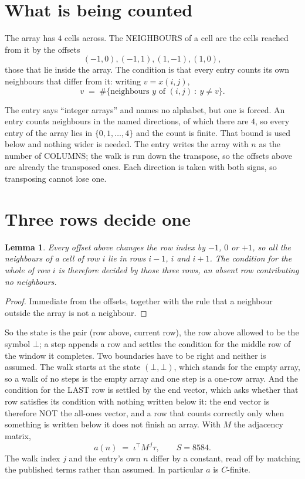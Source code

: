 \documentclass[11pt,a4paper]{article}
\theoremstyle{plain}
\newtheorem{lemma}[theorem]{Lemma}
\theoremstyle{definition}
\begin{document}
\section{What is being counted}

The array has $4$ cells across. The NEIGHBOURS of a cell are the cells reached from it by the
offsets
\[
(-1,0), (-1,1), (1,-1), (1,0),
\]
those that lie inside the array. The condition is that every entry counts its own neighbours
that differ from it: writing $v=x(i,j)$,
\[
v\;=\;\#\{\text{neighbours } y \text{ of } (i,j)\ :\ y\ne v\} .
\]

The entry says ``integer arrays'' and names no alphabet, but one is forced. An entry counts
neighbours in the named directions, of which there are $4$, so every entry of the array
lies in $\{0,1,\dots,4\}$ and the count is finite. That bound is used below and
nothing wider is needed. The entry writes the array with $n$ as the number of COLUMNS; the walk is run down the transpose, so the offsets above are already the transposed ones. Each direction is taken with both signs, so transposing cannot lose one.

\section{Three rows decide one}

\begin{lemma}\label{lem:win}
Every offset above changes the row index by $-1$, $0$ or $+1$, so all the neighbours of a cell
of row $i$ lie in rows $i-1$, $i$ and $i+1$. The condition for the whole of row $i$ is
therefore decided by those three rows, an absent row contributing no neighbours.
\end{lemma}

\begin{proof}
Immediate from the offsets, together with the rule that a neighbour outside the array is not a
neighbour.
\end{proof}

So the state is the pair (row above, current row), the row above allowed to be the symbol
$\bot$; a step appends a row and settles the condition for the middle row of the window it
completes. Two boundaries have to be right and neither is assumed. The walk starts at the state
$(\bot,\bot)$, which stands for the empty array, so a walk of no steps is the empty array and
one step is a one-row array. And the condition for the LAST row is settled by the end vector,
which asks whether that row satisfies its condition with nothing written below it: the end
vector is therefore NOT the all-ones vector, and a row that counts correctly only when
something is written below it does not finish an array. With $M$ the adjacency matrix,
\[
a(n)\;=\;\iota^{\!\top}M^{\,j}\tau ,\qquad S=8584.
\]
The walk index $j$ and the entry's own $n$ differ by a constant, read off by matching the
published terms rather than assumed. In particular $a$ is $C$-finite.
\end{document}
